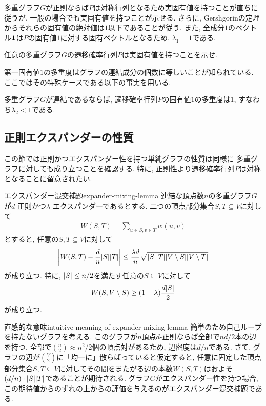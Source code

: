 多重グラフ$G$が正則ならば$P$は対称行列となるため実固有値を持つことが直ちに従うが, 一般の場合でも実固有値を持つことが示せる.
さらに, Gershgorinの定理からそれらの固有値の絶対値は$1$以下であることが従う.
また, 全成分$1$のベクトル$\mathbf{1}$は$P$の固有値$1$に対する固有ベクトルとなるため, $\lambda_1=1$である.

\begin{exercise}{}{}
  任意の多重グラフ$G$の遷移確率行列$P$は実固有値を持つことを示せ.
\end{exercise}

第一固有値$1$の多重度はグラフの連結成分の個数に等しいことが知られている.
ここではその特殊ケースである以下の事実を用いる.

\begin{proposition}{}{}
  多重グラフ$G$が連結であるならば, 遷移確率行列$P$の固有値$1$の多重度は$1$, すなわち$\lambda_2<1$である.
\end{proposition}

\subsection{正則エクスパンダーの性質}

この節では正則かつエクスパンダー性を持つ単純グラフの性質は同様に
多重グラフに対しても成り立つことを確認する.
特に, 正則性より遷移確率行列$P$は対称となることに留意されたい.

\begin{lemma}{エクスパンダー混交補題}{expander-mixing-lemma}
  連結な頂点数$n$の多重グラフ$G$が$d$-正則かつ$\lambda$-エクスパンダーであるとする.
  二つの頂点部分集合$S,T\subseteq V$に対して
  \begin{align*}
    W(S,T) = \sum_{u \in S, v\in T} w(u,v)
  \end{align*}
  とすると, 任意の$S,T\subseteq V$に対して
  \begin{align*}
    \abs{ W(S,T) - \frac{d}{n}\abs{S}\abs{T} } \le \frac{\lambda d}{n} \sqrt{\abs{S}\abs{T}\abs{V\setminus S}\abs{V\setminus T}}
  \end{align*}
  が成り立つ. 特に, $\abs{S}\le n/2$を満たす任意の$S\subseteq V$に対して
  \begin{align*}
    W(S,V\setminus S) \ge (1-\lambda)\frac{d\abs{S}}{2}
  \end{align*}
  が成り立つ.
\end{lemma}

\begin{remark}{直感的な意味}{intuitive-meaning-of-expander-mixing-lemma}
  簡単のため自己ループを持たないグラフを考える.
  このグラフが$n$頂点$d$-正則ならば全部で$nd/2$本の辺を持つ.
  全部で$\binom{n}{2}\approx n^2/2$個の頂点対があるため, 辺密度は$d/n$である.
  さて, グラフの辺が$\binom{V}{2}$に「均一に」散らばっていると仮定すると, 任意に固定した頂点部分集合$S,T\subseteq V$に対してその間をまたがる辺の本数$W(S,T)$はおよそ$(d/n)\cdot \abs{S}\abs{T}$であることが期待される.
  グラフ$G$がエクスパンダー性を持つ場合, この期待値からのずれの上からの評価を与えるのがエクスパンダー混交補題である.
\end{remark}

